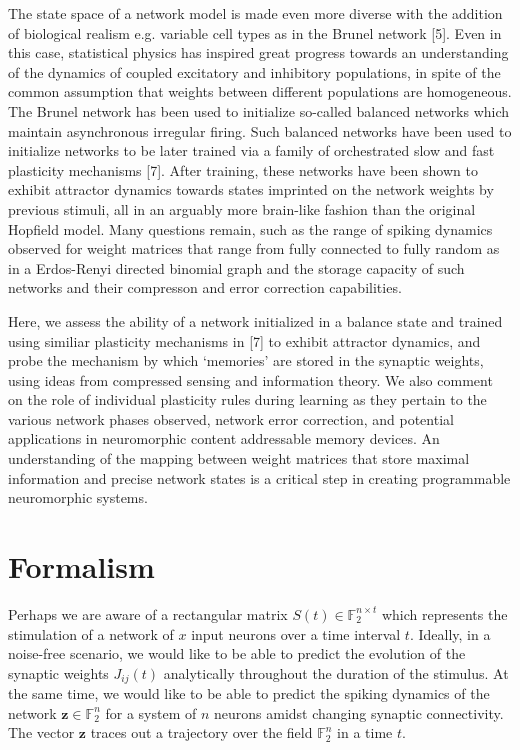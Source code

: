 \documentclass{article} %
\begin{document}
The state space of a network model is made even more diverse with the addition of biological realism e.g. variable cell types as in the Brunel network [5]. Even in this case, statistical physics has inspired great progress towards an understanding of the dynamics of coupled excitatory and inhibitory populations, in spite of the common assumption that weights between different populations are homogeneous. The Brunel network has been used to initialize so-called balanced networks which maintain asynchronous irregular firing. Such balanced networks have been used to initialize networks to be later trained via a family of orchestrated slow and fast plasticity mechanisms [7]. After training, these networks have been shown to exhibit attractor dynamics towards states imprinted on the network weights by previous stimuli, all in an arguably more brain-like fashion than the original Hopfield model. Many questions remain, such as the range of spiking dynamics observed for weight matrices that range from fully connected to fully random as in a Erdos-Renyi directed binomial graph and the storage capacity of such networks and their compresson and error correction capabilities.

Here, we assess the ability of a network initialized in a balance state and trained using similiar plasticity mechanisms in [7] to exhibit attractor dynamics, and probe the mechanism by which `memories' are stored in the synaptic weights, using ideas from compressed sensing and information theory. We also comment on the role of individual plasticity rules during learning as they pertain to the various network phases observed, network error correction, and potential applications in neuromorphic content addressable memory devices. An understanding of the mapping between weight matrices that store maximal information and precise network states is a critical step in creating programmable neuromorphic systems.

\section{Formalism}

Perhaps we are aware of a rectangular matrix $S(t) \in \mathbb{F}_{2}^{n\times t}$ which represents the stimulation of a network of $x$ input neurons over a time interval $t$. Ideally, in a noise-free scenario, we would like to be able to predict the evolution of the synaptic weights $J_{ij}(t)$ analytically throughout the duration of the stimulus. At the same time, we would like to be able to predict the spiking dynamics of the network $\mathbf{z} \in \mathbb{F}_{2}^{n}$ for a system of $n$ neurons amidst changing synaptic connectivity. The vector $\mathbf{z}$ traces out a trajectory over the field $\mathbb{F}_{2}^{n}$ in a time $t$.
\end{document}
